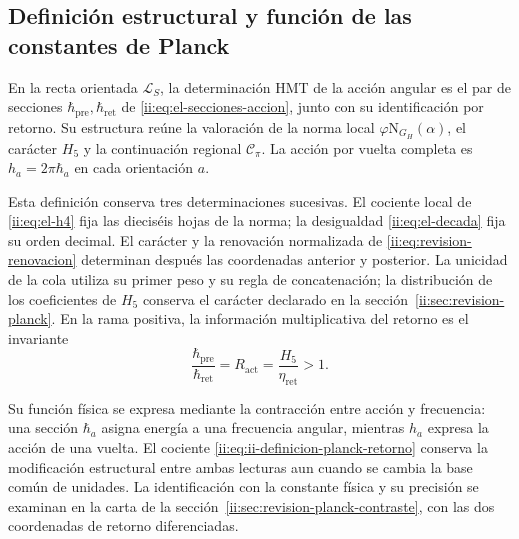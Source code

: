 \subsection{Definición estructural y función de las constantes de Planck}
\label{ii:sec:ii-definicion-planck}

\begin{definition}
En la recta orientada \(\mathcal L_S\), la determinación HMT de la
acción angular es el par de secciones
\(\hbar_{\mathrm{pre}},\hbar_{\mathrm{ret}}\) de
\eqref{ii:eq:el-secciones-accion}, junto con su identificación por retorno.
Su estructura reúne la valoración de la norma local
\(\varphi\mathrm N_{G_H}(\alpha)\), el carácter \(H_5\) y la
continuación regional \(\mathcal C_\pi\). La acción por vuelta completa
es \(h_a=2\pi\hbar_a\) en cada orientación \(a\).
\end{definition}

Esta definición conserva tres determinaciones sucesivas. El cociente
local de \eqref{ii:eq:el-h4} fija las dieciséis hojas de la norma; la
desigualdad \eqref{ii:eq:el-decada} fija su orden decimal. El carácter y
la renovación normalizada de \eqref{ii:eq:revision-renovacion} determinan
después las coordenadas anterior y posterior. La unicidad de la cola
utiliza su primer peso y su regla de concatenación; la distribución de
los coeficientes de \(H_5\) conserva el carácter declarado en la
sección~\ref{ii:sec:revision-planck}. En la rama positiva, la información
multiplicativa del retorno es el invariante
\begin{equation}
 \frac{\hbar_{\mathrm{pre}}}{\hbar_{\mathrm{ret}}}
 =R_{\mathrm{act}}=\frac{H_5}{\eta_{\mathrm{ret}}}>1.
 \label{ii:eq:ii-definicion-planck-retorno}
\end{equation}

Su función física se expresa mediante la contracción entre acción y
frecuencia: una sección \(\hbar_a\) asigna energía a una frecuencia
angular, mientras \(h_a\) expresa la acción de una vuelta. El cociente
\eqref{ii:eq:ii-definicion-planck-retorno} conserva la modificación
estructural entre ambas lecturas aun cuando se cambia la base común
de unidades. La identificación con la constante física y su precisión
se examinan en la carta de la sección~\ref{ii:sec:revision-planck-contraste},
con las dos coordenadas de retorno diferenciadas.
